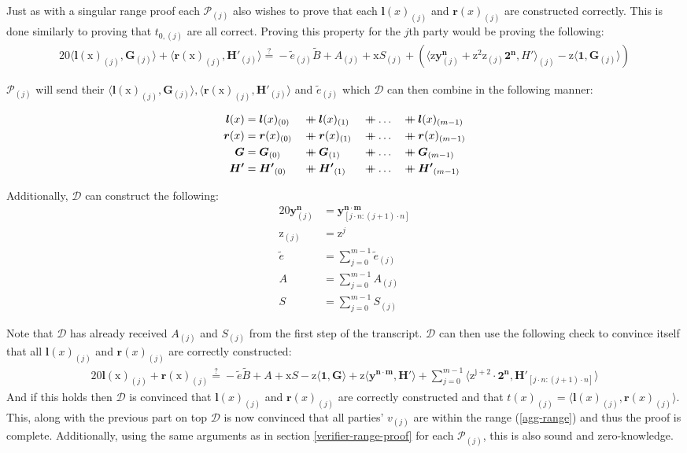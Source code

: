 \documentclass{article}
\newcommand{\eq}[1]{\begin{alignat*}{20}#1\end{alignat*}}
\renewcommand{\vec}[1]{\boldsymbol{#1}}
\newcommand{\ran}[1]{\mathrm{#1}}
\newcommand{\vecran}[1]{\mathbf{#1}}
\renewcommand{\P}{\mathcal{P}}
\newcommand{\D}{\mathcal{D}}
\newcommand\concat{\mathbin{+\mkern-10mu+}} %
\newcommand{\dotp}[2]{\langle #1, #2 \rangle}
\newcommand{\blind}[1]{\widetilde{#1}}
\newcommand{\bB}{\blind{B}}
\newcommand{\be}{\blind{e}}
\begin{document}
Just as with a singular range proof each $\P_{(j)}$ also wishes to prove
that each $\vec{l}(x)_{(j)}$ and $\vec{r}(x)_{(j)}$ are constructed
correctly. This is done similarly to proving that $t_{0,(j)}$
are all correct. Proving this property for the $j$th party would be
proving the following:
\eq{
	\dotp{\vec{l}(\ran{x})_{(j)}}{\vec{G}_{(j)}} + \dotp{\vec{r}(\ran{x})_{(j)}}{\vec{H'}_{(j)}} \stackrel{?}{=}
	-\be_{(j)}\bB + A_{(j)} + \ran{x}S_{(j)} +
	(\dotp{\ran{z}\vecran{y}^{\vec{n}}_{(j)} +
	\ran{z}^2\ran{z}_{(j)}\vec{2^n}}{H'}_{(j)} -
	\ran{z}\dotp{\vec{1}}{\vec{G}_{(j)}})
}

$\P_{(j)}$ will send their $\dotp{\vec{l}(\ran{x})_{(j)}}{\vec{G}_{(j)}},
\dotp{\vec{r}(\ran{x})_{(j)}}{\vec{H'}_{(j)}}$ and $\be_{(j)}$
which $\D$ can then combine in the following manner:

\eq{
	\vec{l}(x) &= \vec{l}(x)_{(0)} &&\concat \vec{l}(x)_{(1)} &&\concat \dots &&\concat \vec{l}(x)_{(m-1)}\\
	\vec{r}(x) &= \vec{r}(x)_{(0)} &&\concat \vec{r}(x)_{(1)} &&\concat \dots &&\concat \vec{r}(x)_{(m-1)}\\
	\vec{G}    &= \vec{G}_{(0)}    &&\concat \vec{G}_{(1)}    &&\concat \dots &&\concat \vec{G}_{(m-1)}\\
	\vec{H'}   &= \vec{H'}_{(0)}   &&\concat \vec{H'}_{(1)}   &&\concat \dots &&\concat \vec{H'}_{(m-1)}
}

\newpage

Additionally, $\D$ can construct the following:
\eq{
	\vecran{y}^{\vec{n}}_{(j)} &= \vecran{y}^{\vec{n \cdot m}}_{[j \cdot n : (j+1) \cdot n]}\\
	\ran{z}_{(j)}      &= \ran{z}^j\\
	\be      &= \sum^{m-1}_{j = 0} \be_{(j)}\\
	A                  &= \sum^{m-1}_{j = 0} A_{(j)}\\
	S                  &= \sum^{m-1}_{j = 0} S_{(j)}
}

Note that $\D$ has already received $A_{(j)}$ and $S_{(j)}$ from the
first step of the transcript. $\D$ can then use the following check
to convince itself that all $\vec{l}(x)_{(j)}$ and $\vec{r}(x)_{(j)}$
are correctly constructed:
\eq{
	\vec{l}(\ran{x})_{(j)} + \vec{r}(\ran{x})_{(j)} \stackrel{?}{=}
	-\be\bB + A + \ran{x}S - \ran{z}\dotp{\vec{1}}{\vec{G}} +
	\ran{z}\dotp{\vecran{y}^{\vec{n \cdot m}}}{\vec{H'}} +
	\sum^{m-1}_{j = 0}\dotp{\ran{z^{j+2}} \cdot \vec{2^n}}{\vec{H'}_{[j \cdot n: (j+1) \cdot n]}}
}
And if this holds then $\D$ is convinced that $\vec{l}(x)_{(j)}$ and
$\vec{r}(x)_{(j)}$ are correctly constructed and that $t(x)_{(j)}
= \dotp{\vec{l}(x)_{(j)}}{\vec{r}(x)_{(j)}}$. This, along with
the previous part on top $\D$ is now convinced that all parties'
$v_{(j)}$ are within the range (\ref{agg-range}) and thus the proof
is complete. Additionally, using the same arguments as in section
\ref{verifier-range-proof} for each $\P_{(j)}$, this is also sound
and zero-knowledge.
\end{document}
